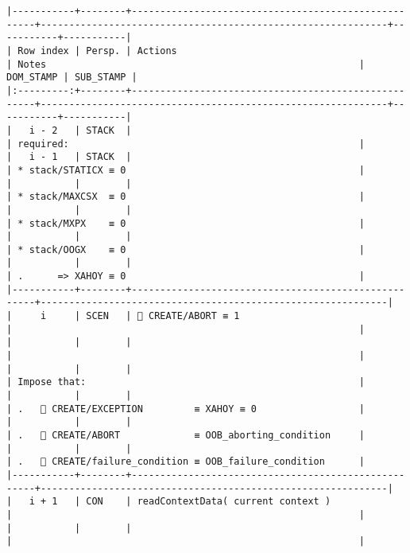 \documentclass[varwidth=\maxdimen,margin=0.5cm,multi={verbatim}]{standalone}
\begin{document}
\begin{verbatim}
|-----------+--------+-----------------------------------------------------+-------------------------------------------------------------+-----------+-----------|
| Row index | Persp. | Actions                                             | Notes                                                       | DOM_STAMP | SUB_STAMP |
|:---------:+--------+-----------------------------------------------------+-------------------------------------------------------------+-----------+-----------|
|   i - 2   | STACK  |                                                     | required:                                                   |
|   i - 1   | STACK  |                                                     | * stack/STATICX ≡ 0                                         |
|           |        |                                                     | * stack/MAXCSX  ≡ 0                                         |
|           |        |                                                     | * stack/MXPX    ≡ 0                                         |
|           |        |                                                     | * stack/OOGX    ≡ 0                                         |
|           |        |                                                     | .      => XAHOY ≡ 0                                         |
|-----------+--------+-----------------------------------------------------+-------------------------------------------------------------|
|     i     | SCEN   |  CREATE/ABORT ≡ 1                                  |                                                             |
|           |        |                                                     |                                                             |
|           |        |                                                     | Impose that:                                                |
|           |        |                                                     | .    CREATE/EXCEPTION         ≡ XAHOY ≡ 0                  |
|           |        |                                                     | .    CREATE/ABORT             ≡ OOB_aborting_condition     |
|           |        |                                                     | .    CREATE/failure_condition ≡ OOB_failure_condition      |
|-----------+--------+-----------------------------------------------------+-------------------------------------------------------------|
|   i + 1   | CON    | readContextData( current context )                  |                                                             |
|           |        |                                                     |                                                             |

\end{verbatim}
\end{document}
